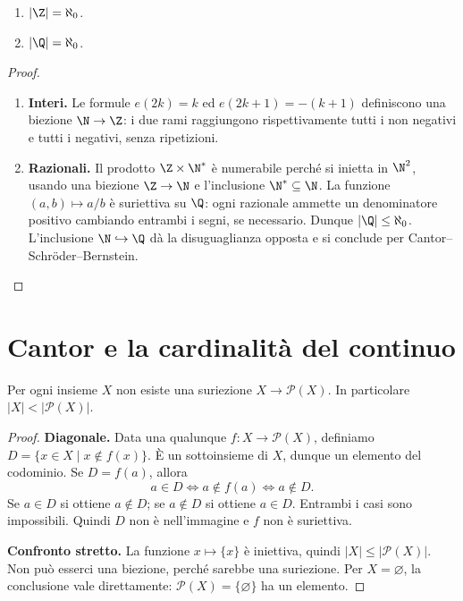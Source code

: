 \begin{corollario}
\begin{enumerate}[label=\arabic*.]
\item $|\Z|=\aleph_0$.
\item $|\Q|=\aleph_0$.
\end{enumerate}
\end{corollario}
\begin{proof}
\begin{enumerate}[label=\arabic*.]
\item \textbf{Interi.} Le formule $e(2k)=k$ ed $e(2k+1)=-(k+1)$ definiscono una biezione $\N\to\Z$: i due rami raggiungono rispettivamente tutti i non negativi e tutti i negativi, senza ripetizioni.
\item \textbf{Razionali.} Il prodotto $\Z\times\N^*$ è numerabile perché si inietta in $\N^2$, usando una biezione $\Z\to\N$ e l'inclusione $\N^*\subseteq\N$. La funzione $(a,b)\mapsto a/b$ è suriettiva su $\Q$: ogni razionale ammette un denominatore positivo cambiando entrambi i segni, se necessario. Dunque $|\Q|\le\aleph_0$. L'inclusione $\N\hookrightarrow\Q$ dà la disuguaglianza opposta e si conclude per Cantor--Schröder--Bernstein.
\end{enumerate}
\end{proof}

\section{Cantor e la cardinalità del continuo}
\begin{teorema}[Cantor]\label{teo:cantor}
Per ogni insieme $X$ non esiste una suriezione $X\to\mathcal P(X)$. In particolare $|X|<|\mathcal P(X)|$.
\end{teorema}
\begin{proof}
\textbf{Diagonale.} Data una qualunque $f:X\to\mathcal P(X)$, definiamo $D=\{x\in X\mid x\notin f(x)\}$. È un sottoinsieme di $X$, dunque un elemento del codominio. Se $D=f(a)$, allora
\[
a\in D\iff a\notin f(a)\iff a\notin D.
\]
Se $a\in D$ si ottiene $a\notin D$; se $a\notin D$ si ottiene $a\in D$. Entrambi i casi sono impossibili. Quindi $D$ non è nell'immagine e $f$ non è suriettiva.

\textbf{Confronto stretto.} La funzione $x\mapsto\{x\}$ è iniettiva, quindi $|X|\le|\mathcal P(X)|$. Non può esserci una biezione, perché sarebbe una suriezione. Per $X=\varnothing$, la conclusione vale direttamente: $\mathcal P(X)=\{\varnothing\}$ ha un elemento.
\end{proof}

